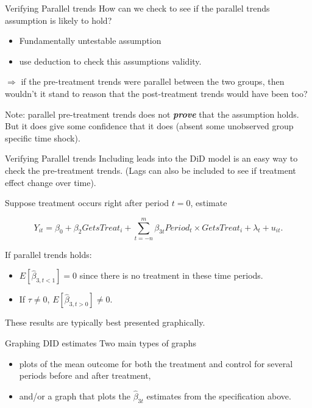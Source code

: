 \documentclass[
  ignorenonframetext,
]{beamer}
\begin{document}
\begin{frame}{Verifying Parallel trends}
\protect\hypertarget{verifying-parallel-trends}{}
How can we check to see if the parallel trends assumption is likely to
hold?

\begin{itemize}
\item
  Fundamentally untestable assumption
\item
  use deduction to check this assumptions validity.
\end{itemize}

\(\Rightarrow\) if the pre-treatment trends were parallel between the
two groups, then wouldn't it stand to reason that the post-treatment
trends would have been too?

Note: parallel pre-treatment trends does not \textbf{\textit{prove}}
that the assumption holds. But it does give some confidence that it does
(absent some unobserved group specific time shock).
\end{frame}

\begin{frame}{Verifying Parallel trends}
\protect\hypertarget{verifying-parallel-trends-1}{}
Including leads into the DiD model is an easy way to check the
pre-treatment trends. (Lags can also be included to see if treatment
effect change over time).

Suppose treatment occurs right after period \(t=0\), estimate

\[
Y_{it}=\beta_0+\beta_2GetsTreat_i+\sum_{t=-n}^m\beta_{3t}Period_t \times GetsTreat_i+\lambda_t+u_{it}.
\]

If parallel trends holds:

\begin{itemize}
\item
  \(E[\hat{\beta}_{3,t<1}]=0\) since there is no treatment in these time
  periods.
\item
  If \(\tau\neq0\), \(E[\hat{\beta}_{3,t>0}]\neq0\).
\end{itemize}

These results are typically best presented graphically.
\end{frame}

\begin{frame}{Graphing DID estimates}
\protect\hypertarget{graphing-did-estimates}{}
Two main types of graphs

\begin{itemize}
\item
  plots of the mean outcome for both the treatment and control for
  several periods before and after treatment,
\item
  and/or a graph that plots the \(\hat{\beta}_{3t}\) estimates from the
  specification above.
\end{itemize}
\end{frame}
\end{document}
